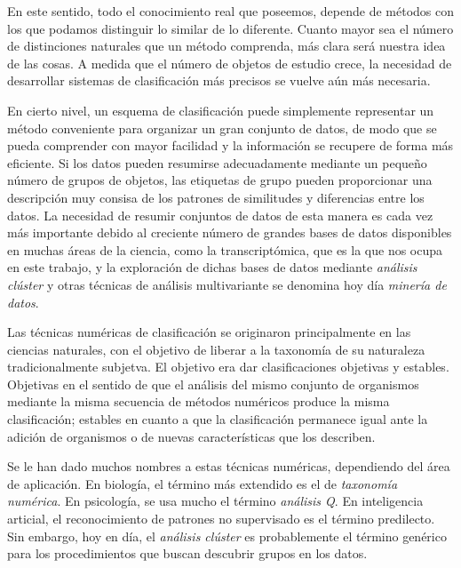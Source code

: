 En este sentido, todo el conocimiento real que poseemos, depende de métodos con los que podamos distinguir lo similar de lo diferente. Cuanto mayor sea el 
número de distinciones naturales que un método comprenda, más clara será nuestra idea de las cosas. A medida que el número de objetos de estudio crece, la 
necesidad de desarrollar sistemas de clasificación más precisos se vuelve aún más necesaria. \newline

En cierto nivel, un esquema de clasificación puede simplemente representar un método conveniente para organizar un gran conjunto de datos, de modo que se pueda
comprender con mayor facilidad y la información se recupere de forma más eficiente. Si los datos pueden resumirse adecuadamente mediante un pequeño número de grupos
de objetos, las etiquetas de grupo pueden proporcionar una descripción muy consisa de los patrones de similitudes y diferencias entre los datos. La necesidad de 
resumir conjuntos de datos de esta manera es cada vez más importante debido al creciente número de grandes bases de datos disponibles en muchas áreas de la ciencia,
como la transcriptómica, que es la que nos ocupa en este trabajo, y la exploración de dichas bases de datos mediante \textit{análisis clúster} y otras técnicas de 
análisis multivariante se denomina hoy día \textit{minería de datos}. \newline

Las técnicas numéricas de clasificación se originaron principalmente en las ciencias naturales, con el objetivo de liberar a la taxonomía de su naturaleza tradicionalmente
subjetva. El objetivo era dar clasificaciones objetivas y estables. Objetivas en el sentido de que el análisis del mismo conjunto de organismos mediante la misma 
secuencia de métodos numéricos produce la misma clasificación; estables en cuanto a que la clasificación permanece igual ante la adición de organismos o de nuevas
características que los describen. \newline

Se le han dado muchos nombres a estas técnicas numéricas, dependiendo del área de aplicación. En biología, el término más extendido es el de \textit{taxonomía numérica}.
En psicología, se usa mucho el término \textit{análisis Q}. En inteligencia articial, el reconocimiento de patrones no supervisado es el término predilecto. Sin embargo,
hoy en día, el \textit{análisis clúster} es probablemente el término genérico para los procedimientos que buscan descubrir grupos en los datos. \newline

